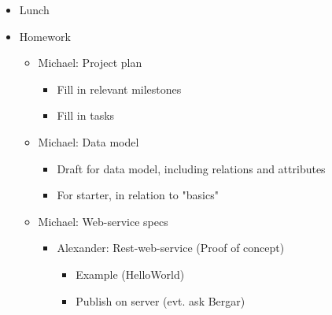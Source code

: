 \documentclass[11pt]{article}
\begin{document}
\begin{landscape}
\begin{multicols}{2}
\begin{itemize}
\begin{itemize}
\begin{itemize}
\item 1: Search in media (free test etc..)
\item 2: Comments / Ratings
\item 2: Favorites
\item 3: Analytic -> collection of data
\item 3: Pay-per-view / Money
\item 3: Subscriptions / Money
\item \begin{verbatim}
######################
\end{verbatim}
\item 4: Others who watched/liked this also watched/liked
\item 4: Share on facebook button
\item 4: Revenue shares for premium content
\item 4: Approvement of films by administrator
\item 5: Login using facebook
\item 5: Remember me feature
\item 5: Cash prizes for most seen/liked films .. (could be handled manually..)
\item 5: Administration / Moderation
\end{itemize}
\end{itemize}
\item Lunch
\item Homework
\begin{itemize}
\item Michael: Project plan
\begin{itemize}
\item Fill in relevant milestones
\item Fill in tasks
\end{itemize}
\item Michael: Data model
\begin{itemize}
\item Draft for data model, including relations and attributes
\item For starter, in relation to "basics"
\end{itemize}
\item Michael: Web-service specs
\begin{itemize}
\item Alexander: Rest-web-service (Proof of concept)
\begin{itemize}
\item Example (HelloWorld)
\item Publish on server (evt. ask Bergar)

\end{itemize}
\end{itemize}
\end{itemize}
\end{itemize}
\end{multicols}
\end{landscape}
\end{document}
